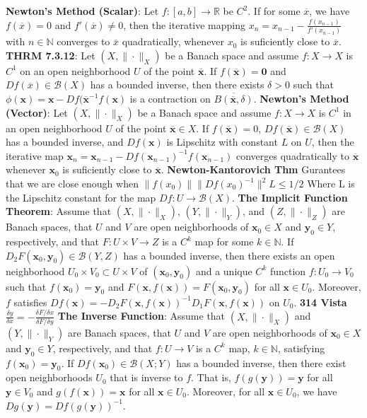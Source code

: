 \documentclass[8pt]{extarticle}
\theoremstyle{definition}
\begin{document}
\textbf{Newton's Method (Scalar)}: Let $f:[a,b] \rightarrow \mathbb{R}$ be $C^2$. If for some $\overline{x}$, we have $f(\overline{x}) = 0$ and $f'(\overline{x}) \neq 0$, then the iterative mapping $x_n = x_{n-1} -  \frac{f(x_{n-1})}{f'(x_{n-1})}$ with $n \in \mathbb{N}$ converges to $\overline{x}$ quadratically, whenever $x_0$ is suficiently close to $\overline{x}$.
\textbf{THRM 7.3.12}: Let $(X, \| \cdot \|_X )$ be a Banach space and assume $f: X \rightarrow X$ is $C^1$ on an open neighborhood $U$ of the point $\overline{\textbf{x}}$. If $f(\overline{\textbf{x}}) = \textbf{0}$ and $Df(\overline{x}) \in \mathscr{B}(X)$ has a bounded inverse, then there exists $\delta > 0$ such that $\phi(\textbf{x}) = \textbf{x} - Df(\overline{\textbf{x}}^{-1}f(\textbf{x})$ is a contraction on $\overline{B(\overline{\textbf{x}}, \delta)}$.
\textbf{Newton's Method (Vector)}: Let $(X, \| \cdot \|_X )$ be a Banach space and assume $f:X \rightarrow X$ is $C^1$ in an open neighborhood $U$ of the point $\overline{\textbf{x}} \in X$. If $f(\overline{\textbf{x}}) = 0$, $Df(\overline{\textbf{x}}) \in \mathscr{B}(X)$ has a bounded inverse, and $Df(\textbf{x})$ is Lipschitz with constant $L$ on $U$, then the iterative map $\textbf{x}_n = \textbf{x}_{n-1} - Df(\textbf{x}_{n-1})^{-1}f(\textbf{x}_{n-1})$ converges quadratically to $\overline{\textbf{x}}$ whenever $\textbf{x}_0$ is suficiently close to $\overline{\textbf{x}}$.
\textbf{Newton-Kantorovich Thm} Gurantees that we are close enough when $\|f(x_0)\|\|Df(x_0)^{-1}\|^2L\leq 1/2$ Where L is the Lipschitz constant for the map $Df: U \to \mathscr{B}(X)$.
\textbf{The Implicit Function Theorem}: Assume that $(X, \| \cdot \|_X )$, $(Y, \| \cdot \|_Y )$, and $(Z, \| \cdot \|_Z )$ are Banach spaces, that $U$ and $V$ are open neighborhoods of $\textbf{x}_0 \in X$ and $\textbf{y}_0 \in Y$, respectively, and that $F: U \times V \rightarrow Z$ is a $C^k$ map for some $k \in \mathbb{N}$. If $D_2F(\textbf{x}_0, \textbf{y}_0) \in \mathscr{B}(Y,Z)$ has a bounded inverse, then there exists an open neighborhood $U_0 \times V_0 \subset U\times V$ of $(\textbf{x}_0, \textbf{y}_0)$ and a unique $C^k$ function $f:U_0 \rightarrow V_0$ such that $f(\textbf{x}_0) = \textbf{y}_0$ and $F(\textbf{x}, f(\textbf{x})) = F(\textbf{x}_0, \textbf{y}_0)$ for all $\textbf{x} \in U_0$. Moreover, $f$ satisfies $Df(\textbf{x}) = -D_2F(\textbf{x}, f(\textbf{x}))^{-1}D_1F(\textbf{x}, f(\textbf{x}))$ on $U_0$.
\textbf{314 Vista} $\frac{\delta y}{\delta x} = - \frac{\delta F/ \delta x}{\delta F / \delta y}$
\textbf{The Inverse Function}: Assume that  $(X, \| \cdot \|_X )$ and $(Y, \| \cdot \|_Y )$ are Banach spaces, that $U$ and $V$ are open neighborhoods of $\textbf{x}_0 \in X$ and $\textbf{y}_0 \in Y$, respectively, and that $f:U \rightarrow V$ is a $C^k$ map, $k \in \mathbb{N}$, satisfying $f(\textbf{x}_0) = \textbf{y}_0$. If $Df(\textbf{x}_0) \in \mathscr{B}(X;Y)$ has a bounded inverse, then there exist open neighborhoods $U_0$ that is inverse to $f$. That is, $f(g(\textbf{y})) = \textbf{y}$ for all $\textbf{y} \in V_0$ and $g(f(\textbf{x})) = \textbf{x}$ for all $\textbf{x} \in U_0$. Moreover, for all $\textbf{x} \in U_0$, we have $Dg(\textbf{y}) = Df(g(\textbf{y}))^{-1}$. 
\end{document}
